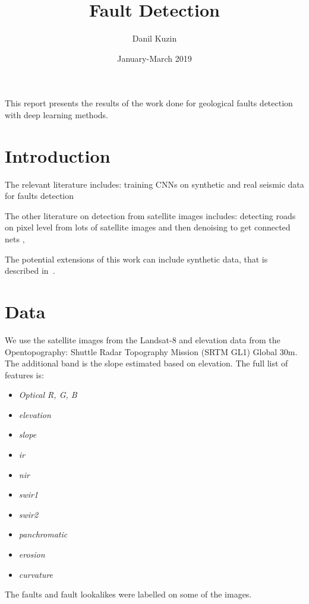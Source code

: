 \documentclass[11pt,a4paper]{article}
\begin{document}
\title{Fault Detection}
\author{Danil Kuzin}
\date{January-March 2019}
\maketitle

\abstract
This report presents the results of the work done for geological faults detection with deep learning methods.



\section{Introduction}

The relevant literature includes: training CNNs on synthetic and real seismic data for faults detection~\cite{pochet2018seismic, araya2017automated, xiong2018seismic, chehrazi2013seismic, lu2018using}

The other literature on detection from satellite images includes: detecting roads on pixel level from lots of satellite images and then denoising to get connected nets \cite{mnih2010learning},

The potential extensions of this work can include synthetic data, that is described in~\cite{hale2014}.

\section{Data}

We use the satellite images from the Landsat-8 and elevation data from the Opentopography:  Shuttle Radar Topography Mission (SRTM GL1) Global 30m. The additional band is the slope estimated based on elevation.
The full list of features is:
\begin{itemize}
\item \textit{Optical R, G, B}
\item \textit{elevation}
\item \textit{slope}
\item \textit{ir}
\item \textit{nir}
\item \textit{swir1}
\item \textit{swir2}
\item \textit{panchromatic}
\item \textit{erosion}
\item \textit{curvature}
\end{itemize}
The faults and fault lookalikes were labelled on some of the images.
\end{document}
